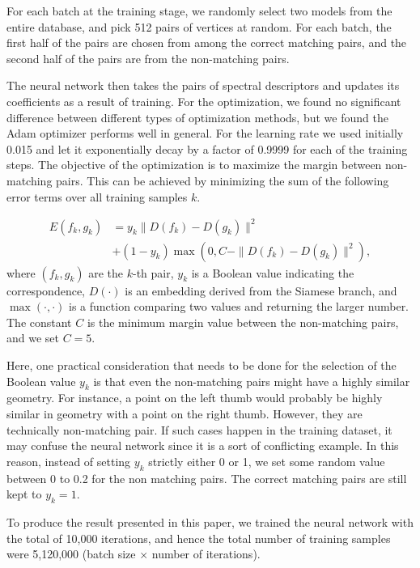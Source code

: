 \documentclass[5p,twocolumn,10pt,times]{elsarticle}
\begin{document}
For each batch at the training stage, we randomly select two models from the entire database, and pick 512 pairs of vertices at random. For each batch, the first half of the pairs are chosen from among the correct matching pairs, and the second half of the pairs are from the non-matching pairs.

The neural network then takes the pairs of spectral descriptors and updates its coefficients as a result of training. For the optimization, we found no significant difference between different types of optimization methods, but we found the Adam optimizer \cite{kingma2014adam} performs well in general. For the learning rate we used initially 0.015 and let it exponentially decay by a factor of 0.9999 for each of the training steps. The objective of the optimization is to maximize the margin between non-matching pairs. This can be achieved by minimizing the sum of the following error terms over all training samples $k$.

\begin{equation}
\begin{aligned}
    E(f_k, g_k)& =  y_k\| D(f_k)-D(g_k) \|^2 \\
    &+ (1-y_k)\max \left(0, C-\|D(f_k)-D(g_k)\|^2 \right),
\end{aligned}
\label{eq:error}
\end{equation}
where $(f_k, g_k)$ are the $k$-th pair, $y_k$ is a Boolean value indicating the correspondence, $D(\cdot)$ is an embedding derived from the Siamese branch, and $\max (\cdot, \cdot)$ is a function comparing two values and returning the larger number. The constant $C$ is the minimum margin value between the non-matching pairs, and we set $C=5$.

Here, one practical consideration that needs to be done for the selection of the Boolean value $y_k$ is that even the non-matching pairs might have a highly similar geometry. For instance, a point on the left thumb would probably be highly similar in geometry with a point on the right thumb. However, they are technically non-matching pair. If such cases happen in the training dataset, it may confuse the neural network since it is a sort of conflicting example. In this reason, instead of setting $y_k$ strictly either 0 or 1, we set some random value between 0 to 0.2 for the non matching pairs. The correct matching pairs are still kept to $y_k=1$.

To produce the result presented in this paper, we trained the neural network with the total of 10,000 iterations, and hence the total number of training samples were 5,120,000 (batch size $\times$ number of iterations).
\end{document}
